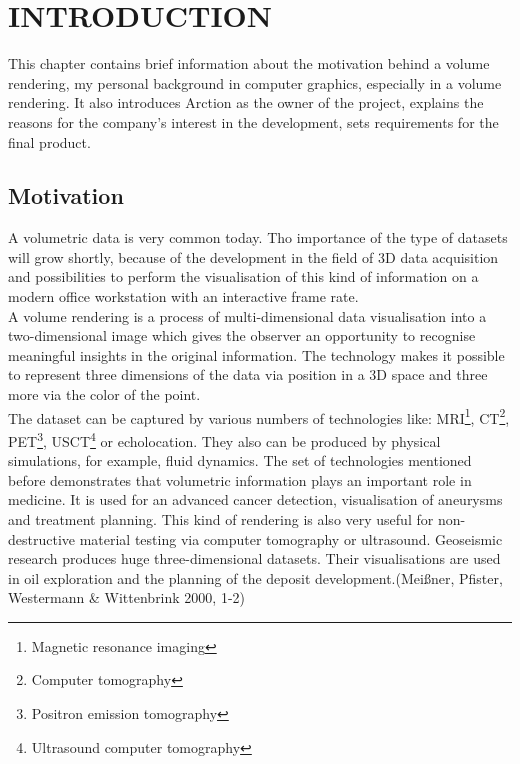 \documentclass[twoside, english, 11pt]{report}
\begin{document}
\newpage

\tableofcontents

\chapter{INTRODUCTION}
This chapter contains brief information about the motivation behind a volume rendering, my personal background in computer graphics, especially in a volume rendering. It also introduces Arction as the owner of the project, explains the reasons for the company's interest in the development, sets requirements for the final product.
\section{Motivation}

A volumetric data is very common today. Tho importance of the type of datasets will grow shortly, because of the development in the field of 3D data acquisition and possibilities to perform the visualisation of this kind of information on a modern office workstation with an interactive frame rate.\\

A volume rendering is a process of multi-dimensional data visualisation into a two-dimensional image which gives the observer an opportunity to recognise meaningful insights in the original information. The technology makes it possible to represent three dimensions of the data via position in a 3D space and three more via the color of the point.\\

The dataset can be captured by various numbers of technologies like: MRI\footnote{Magnetic resonance imaging}, CT\footnote{Computer tomography}, PET\footnote{Positron emission tomography}, USCT\footnote{Ultrasound computer tomography} or echolocation. They also can be produced by physical simulations, for example, fluid dynamics. The set of technologies mentioned before demonstrates that volumetric information plays an important role in medicine. It is used for an advanced cancer detection, visualisation of aneurysms and treatment planning. This kind of rendering is also very useful for non-destructive material testing via computer tomography or ultrasound. Geoseismic research produces huge three-dimensional datasets. Their visualisations are used in oil exploration and the planning of the deposit development.(Meißner, Pfister, Westermann \& Wittenbrink 2000, 1-2)\\
\end{document}
